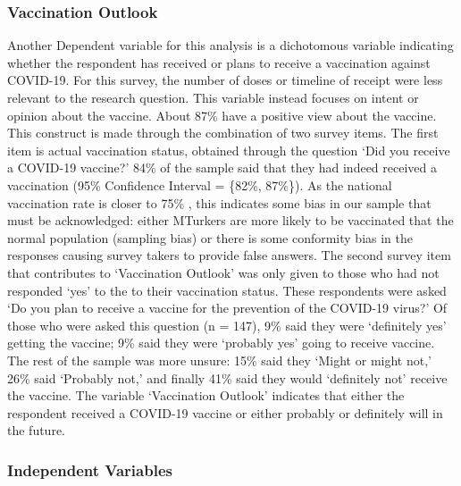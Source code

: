 \hypertarget{vaccination-outlook}{%
\subsubsection{Vaccination Outlook}\label{vaccination-outlook}}



Another Dependent variable for this analysis is a dichotomous variable
indicating whether the respondent has received or plans to receive a vaccination against
COVID-19. For this survey, the number of doses or timeline of receipt were less
relevant to the research question. This variable instead focuses on intent or
opinion about the vaccine. About 87\% have a
positive view about the vaccine. This construct is made through the combination
of two survey items. The first item is actual vaccination status, obtained through
the question `Did you receive a COVID-19 vaccine?'
84\% of the sample said that
they had indeed received a vaccination (95\% Confidence Interval = \{82\%, 87\%\}).
As the national vaccination rate is closer to 75\% \citep{cdc20}, this indicates 
some bias in our sample that must be
acknowledged: either MTurkers are more likely to be vaccinated that the normal
population (sampling bias) or there is some conformity bias in the responses
causing survey takers to provide false answers. The second survey item that
contributes to `Vaccination Outlook' was only given to those who had not
responded `yes' to the to their vaccination status. These respondents were asked 
`Do you plan to receive a vaccine for the prevention of the COVID-19 virus?' Of those
who were asked this question (n = 147), 9\% said they were `definitely yes' getting the vaccine;
9\% said they were `probably yes' going to receive vaccine. The rest of the sample was
more unsure: 15\% said they `Might or might not,' 26\% said `Probably not,' and finally
41\% said they would `definitely not' receive the vaccine. The variable `Vaccination 
Outlook' indicates that either the respondent received a COVID-19 vaccine or
either probably or definitely will in the future.

\hypertarget{independent-variables}{%
\subsubsection{Independent Variables}\label{independent-variables}}

